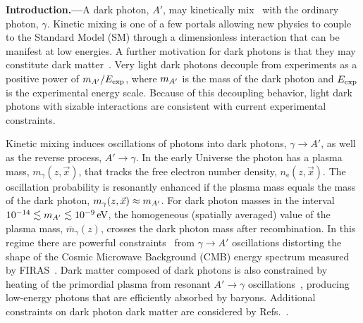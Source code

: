\documentclass[prd,aps,10pt,nofootinbib,twocolumn,superscriptaddress,preprintnumbers,balancelastpage,longbibliography]{revtex4-1}
\begin{document}
\noindent
{\bf Introduction.---}A dark photon, $A'$, may kinetically mix~\cite{Holdom:1985ag} with the ordinary photon, $\gamma$.
Kinetic mixing is one of a few portals allowing new physics to couple to the Standard Model (SM) through a dimensionless interaction that can be manifest at low energies.  A further motivation for dark photons is that they may constitute dark matter~\cite{Redondo:2008ec,Nelson:2011sf,Arias:2012az,Fradette:2014sza,An:2014twa,Graham:2015rva,Agrawal:2018vin,Dror:2018pdh,Co:2018lka,Bastero-Gil:2018uel,Long:2019lwl}. 
Very light dark photons decouple from experiments as a positive power of $m_{A^\prime} / E_{\rm exp}$, where $m_{A^\prime}$ is the mass of the dark photon and $E_{\rm exp}$ is the experimental energy scale.  Because of this decoupling behavior, light dark photons with sizable interactions are consistent with current experimental constraints.

Kinetic mixing induces oscillations of photons into dark photons, $\gamma \rightarrow A'$, as well as the reverse process, $A' \rightarrow \gamma$.  In the early Universe the photon has a plasma mass, $m_\gamma(z, \vec x)$, that tracks the free electron number density,  $n_\mathrm{e}(z, \vec x)$.  
The oscillation probability is resonantly enhanced if the plasma mass equals the mass of the dark photon, $m_\gamma(z, \vec x) \approx m_{A^\prime}$.  For dark photon masses in the interval $10^{-14} \lesssim \mAp \lesssim \SI{e-9}{\eV}$, the homogeneous (spatially averaged) value of the plasma mass, $\overline {m}_\gamma(z)$, crosses the dark photon mass after recombination.  In this regime there are powerful constraints~\cite{Mirizzi:2009iz,Kunze:2015noa} from $\gamma \rightarrow A'$ oscillations distorting the shape of the Cosmic Microwave Background (CMB) energy spectrum measured by FIRAS~\cite{Fixsen:1996nj}.  Dark matter composed of dark photons is also constrained by heating of the primordial plasma from resonant  $A' \rightarrow \gamma$ oscillations~\cite{McDermott:2019lch}, producing low-energy photons that are efficiently absorbed by baryons.  Additional constraints on dark photon dark matter are considered by Refs.~\cite{Arias:2012az,Dubovsky:2015cca,Kovetz:2018zes,Wadekar:2019xnf}.
\end{document}
